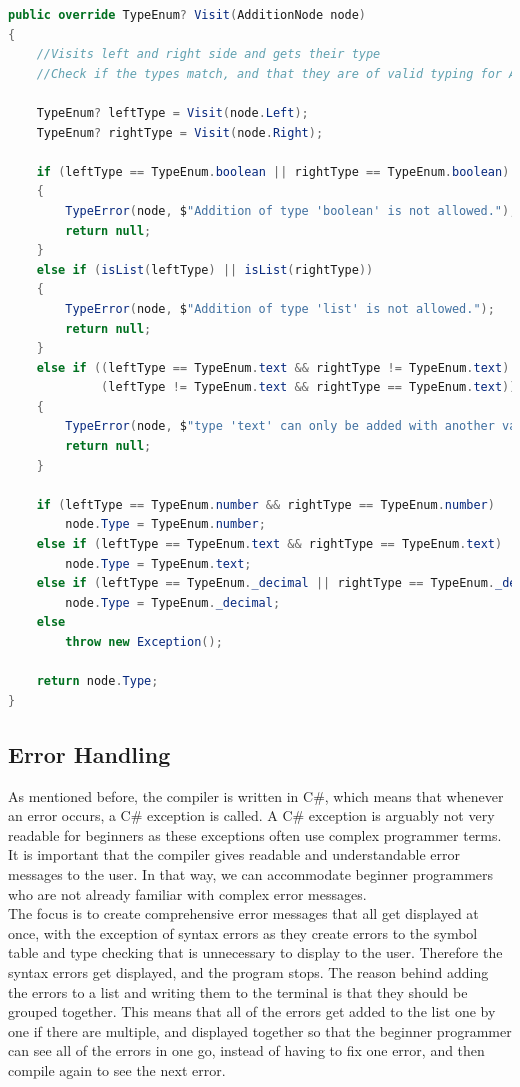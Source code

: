 \begin{lstlisting}[language = csharp, firstnumber=273, label={Typechecker:AdditionNode},caption=Visit(AdditionNode node) - CobraCompiler/TypeChecker.cs]
public override TypeEnum? Visit(AdditionNode node)
{
    //Visits left and right side and gets their type
    //Check if the types match, and that they are of valid typing for Addition

    TypeEnum? leftType = Visit(node.Left);
    TypeEnum? rightType = Visit(node.Right);
    
    if (leftType == TypeEnum.boolean || rightType == TypeEnum.boolean) 
    {
        TypeError(node, $"Addition of type 'boolean' is not allowed.");
        return null;
    }
    else if (isList(leftType) || isList(rightType))
    {
        TypeError(node, $"Addition of type 'list' is not allowed.");
        return null;
    }
    else if ((leftType == TypeEnum.text && rightType != TypeEnum.text) ||
             (leftType != TypeEnum.text && rightType == TypeEnum.text))
    {
        TypeError(node, $"type 'text' can only be added with another value of type 'text.");
        return null;
    }

    if (leftType == TypeEnum.number && rightType == TypeEnum.number)
        node.Type = TypeEnum.number;
    else if (leftType == TypeEnum.text && rightType == TypeEnum.text)
        node.Type = TypeEnum.text;
    else if (leftType == TypeEnum._decimal || rightType == TypeEnum._decimal)
        node.Type = TypeEnum._decimal;
    else
        throw new Exception();

    return node.Type;
}
\end{lstlisting}

\subsection{Error Handling}
As mentioned before, the compiler is written in C\#, which means that whenever an error occurs, a C\# exception is called. A C\# exception is arguably not very readable for beginners as these exceptions often use complex programmer terms. It is important that the compiler gives readable and understandable error messages to the user. In that way, we can accommodate beginner programmers who are not already familiar with complex error messages.\\

The focus is to create comprehensive error messages that all get displayed at once, with the exception of syntax errors as they create errors to the symbol table and type checking that is unnecessary to display to the user. Therefore the syntax errors get displayed, and the program stops. The reason behind adding the errors to a list and writing them to the terminal is that they should be grouped together. This means that all of the errors get added to the list one by one if there are multiple, and displayed together so that the beginner programmer can see all of the errors in one go, instead of having to fix one error, and then compile again to see the next error.\\

